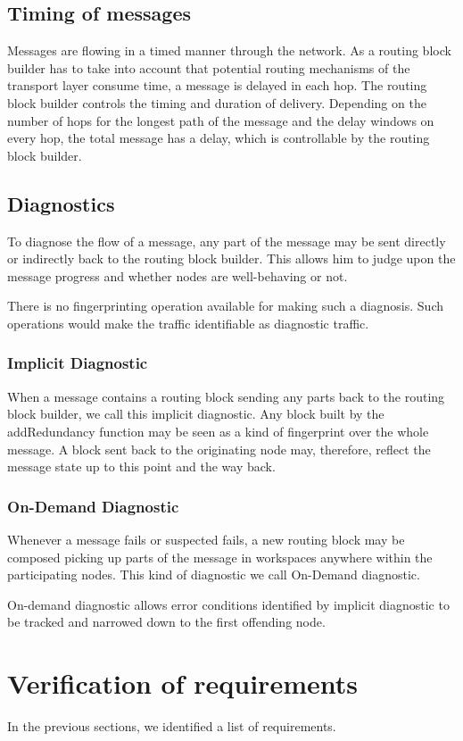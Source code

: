 \subsection{Timing of messages}
Messages are flowing in a timed manner through the network. As a routing block builder has to take into account that potential routing mechanisms of the transport layer consume time, a message is delayed in each hop.  The routing block builder controls the timing and duration of delivery. Depending on the number of hops for the longest path of the message and the delay windows on every hop, the total message has a delay, which is controllable by the routing block builder.

\subsection{Diagnostics}
To diagnose the flow of a message, any part of the message may be sent directly or indirectly back to the routing block builder. This allows him to judge upon the message progress and whether nodes are well-behaving or not.

There is no fingerprinting operation available for making such a diagnosis. Such operations would make the traffic identifiable as diagnostic traffic.

\subsubsection{Implicit Diagnostic}
When a message contains a routing block sending any parts back to the routing block builder, we call this implicit diagnostic. Any block built by the addRedundancy function may be seen as a kind of fingerprint over the whole message. A block sent back to the originating node may, therefore, reflect the message state up to this point and the way back.

\subsubsection{On-Demand Diagnostic}
Whenever a message fails or suspected fails, a new routing block may be composed picking up parts of the message in workspaces anywhere within the participating nodes. This kind of diagnostic we call On-Demand diagnostic.

On-demand diagnostic allows error conditions identified by implicit diagnostic to be tracked and narrowed down to the first offending node.

\section{Verification of requirements}
In the previous sections, we identified a list of requirements.

